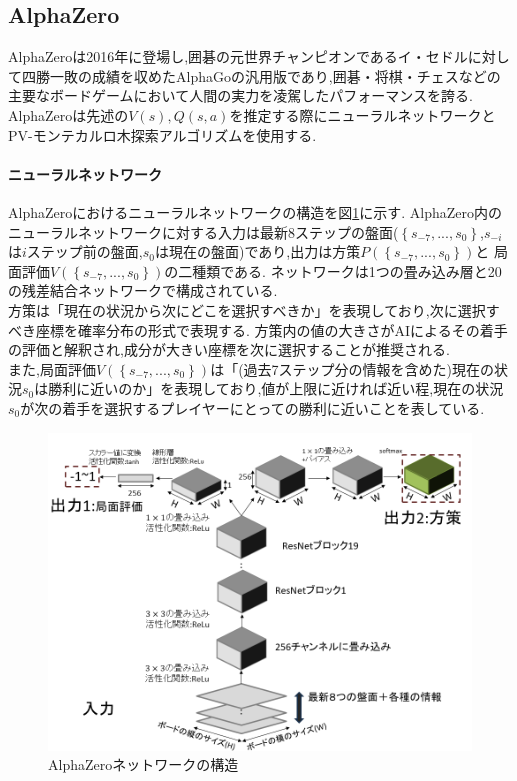 \subsection{AlphaZero}
AlphaZeroは2016年に登場し,囲碁の元世界チャンピオンであるイ・セドルに対して四勝一敗の成績を収めたAlphaGoの汎用版であり,囲碁・将棋・チェスなどの主要なボードゲームにおいて人間の実力を凌駕したパフォーマンスを誇る.
AlphaZeroは先述の$V(s),Q(s, a)$を推定する際にニューラルネットワークとPV-モンテカルロ木探索アルゴリズムを使用する.
\paragraph{ニューラルネットワーク}
AlphaZeroにおけるニューラルネットワークの構造を図\ref{fig:network}に示す.
AlphaZero内のニューラルネットワークに対する入力は最新$8$ステップの盤面($\left\{ s_{-7}, ..., s_0 \right\}$,$s_{-i}$は$i$ステップ前の盤面,$s_{0}$は現在の盤面)であり,出力は方策$P(\left\{ s_{-7}, ..., s_0 \right\})$と
局面評価$V(\left\{ s_{-7}, ..., s_0 \right\})$の二種類である.
ネットワークは1つの畳み込み層と20の残差結合ネットワークで構成されている.  \\
方策は「現在の状況から次にどこを選択すべきか」を表現しており,次に選択すべき座標を確率分布の形式で表現する.
方策内の値の大きさがAIによるその着手の評価と解釈され,成分が大きい座標を次に選択することが推奨される.\\
また,局面評価$V(\left\{ s_{-7}, ..., s_0 \right\})$は「(過去7ステップ分の情報を含めた)現在の状況$s_0$は勝利に近いのか」を表現しており,値が上限に近ければ近い程,現在の状況$s_0$が次の着手を選択するプレイヤーにとっての勝利に近いことを表している.
\begin{figure}[t]
	\centering
	\includegraphics[width=\linewidth]{./figure/network.png}
	\caption{AlphaZeroネットワークの構造}
	\label{fig:network}
\end{figure}
